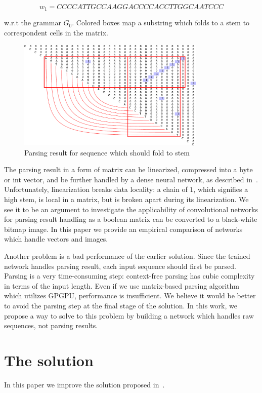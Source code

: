\documentclass[runningheads]{llncs}
\begin{document}
\[
w_1 = CCCCATTGCCAAGGACCCCACCTTGGCAATCCC
\]

w.r.t the grammar $G_0$.
Colored boxes map a substring which folds to a stem to correspondent cells in the matrix.

\begin{figure}[h]
\begin{center}
\centering
\includegraphics[width=0.8\textwidth]{figures/4.pdf}
\caption{Parsing result for sequence which should fold to
stem}
\label{fig:example}
\end{center}
\end{figure}

The parsing result in a form of matrix can be linearized, compressed into a byte or int vector, and be further handled by a dense neural network, as described in~\cite{grigorevcomposition}.
Unfortunately, linearization breaks data locality: a chain of $1$, which signifies a high stem, is local in a matrix, but is broken apart during its linearization.
We see it to be an argument to investigate the applicability of convolutional networks for parsing result handling as a boolean matrix can be converted to a black-white bitmap image.
In this paper we provide an empirical comparison of networks which handle vectors and images.

Another problem is a bad performance of the earlier solution.
Since the trained network handles parsing result, each input sequence should first be parsed.
Parsing is a very time-consuming step: context-free parsing has cubic complexity in terms of the input length.
Even if we use matrix-based parsing algorithm~\cite{Azimov:2018:CPQ:3210259.3210264} which utilizes GPGPU, performance is insufficient.
We believe it would be better to avoid the parsing step at the final stage of the solution.
In this work, we propose a way to solve to this problem by building a network which handles raw sequences, not parsing results.

\section{The solution}
In this paper we improve the solution proposed in~\cite{grigorevcomposition}.
\end{document}
